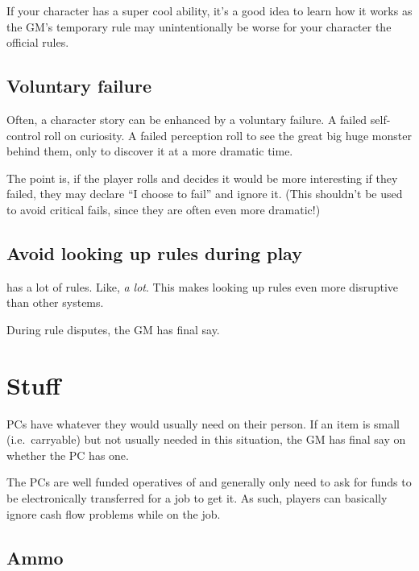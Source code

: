 If your character has a super cool ability, it's a good idea to learn how it
works as the GM's temporary rule may unintentionally be worse for your character
the official rules.

\subsection{Voluntary failure}
\label{sec:voluntary-failure}

Often, a character story can be enhanced by a voluntary failure. A failed
self-control roll on curiosity. A failed perception roll to see the great big
huge monster behind them, only to discover it at a more dramatic time.

The point is, if the player rolls and decides it would be more interesting if
they failed, they may declare ``I choose to fail'' and ignore it. (This
shouldn't be used to avoid critical fails, since they are often even more
dramatic!)


\subsection{Avoid looking up rules during play}
\label{sec:no-rules}

\gurps has a lot of rules. Like, \emph{a lot}. This makes looking up rules even
more disruptive than other systems.

During rule disputes, the GM has final say.


\section{Stuff}
\label{sec:stuff}

PCs have whatever they would usually need on their person. If an item is small
(i.e.~carryable) but not usually needed in this situation, the GM has final say
on whether the PC has one.

\begin{tcolorbox}[title={What about cash?}]
  The PCs are well funded operatives of \thecompany and generally only need to
  ask for funds to be electronically transferred for a job to get it. As such,
  players can basically ignore cash flow problems while on the job.
\end{tcolorbox}


\subsection{Ammo}
\label{sec:ammo}

